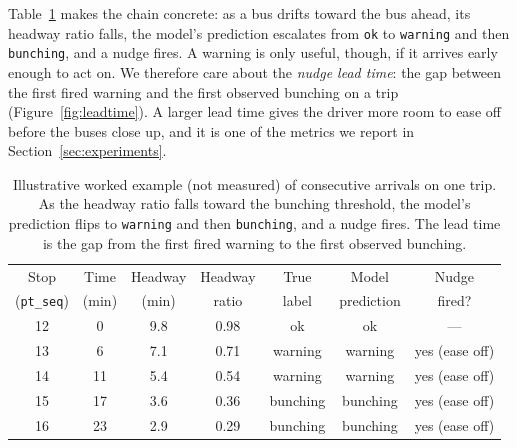 \documentclass[final,5p,times,twocolumn,authoryear]{elsarticle}
\begin{document}
Table~\ref{tab:worked} makes the chain concrete: as a bus drifts toward the bus ahead, its headway
ratio falls, the model's prediction escalates from \texttt{ok} to \texttt{warning} and then
\texttt{bunching}, and a nudge fires. A warning is only useful, though, if it arrives early enough to
act on. We therefore care about the \emph{nudge lead time}: the gap between the first fired warning
and the first observed bunching on a trip (Figure~\ref{fig:leadtime}). A larger lead time gives the
driver more room to ease off before the buses close up, and it is one of the metrics we report in
Section~\ref{sec:experiments}.

\begin{table}[t]
\centering
\caption{Illustrative worked example (not measured) of consecutive arrivals on one trip. As the
headway ratio falls toward the bunching threshold, the model's prediction flips to \texttt{warning}
and then \texttt{bunching}, and a nudge fires. The lead time is the gap from the first fired warning
to the first observed bunching.}
\label{tab:worked}
\footnotesize
\begin{tabular}{ccccccc}
\toprule
Stop & Time & Headway & Headway & True & Model & Nudge \\
(\texttt{pt\_seq}) & (min) & (min) & ratio & label & prediction & fired? \\
\midrule
12 & 0  & 9.8 & 0.98 & ok       & ok       & --- \\
13 & 6  & 7.1 & 0.71 & warning  & warning  & yes (ease off) \\
14 & 11 & 5.4 & 0.54 & warning  & warning  & yes (ease off) \\
15 & 17 & 3.6 & 0.36 & bunching & bunching & yes (ease off) \\
16 & 23 & 2.9 & 0.29 & bunching & bunching & yes (ease off) \\
\bottomrule
\end{tabular}
\end{table}
\end{document}
